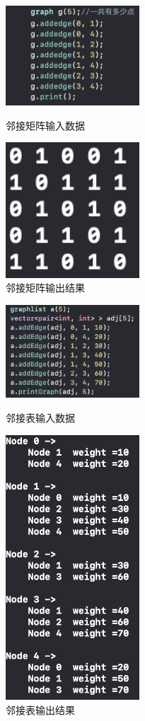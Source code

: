 \documentclass{article}
\begin{document}
\begin{figure}[htb]
    \centering
\begin{minipage}[t]{0.48\textwidth}
    \centering
    \includegraphics[width=5cm]{data.png}
    \caption{邻接矩阵输入数据}
\end{minipage}
\begin{minipage}[t]{0.48\textwidth}
    \centering
    \includegraphics[width=5cm]{conclu.png}
    \caption{邻接矩阵输出结果}
\end{minipage}
\end{figure}

\begin{figure}[htb]
    \centering
\begin{minipage}[t]{0.48\textwidth}
    \centering
    \includegraphics[width=5cm]{data 2.png}
    \caption{邻接表输入数据}
\end{minipage}
\begin{minipage}[t]{0.48\textwidth}
    \centering
    \includegraphics[width=5cm]{conclu 2.png}
    \caption{邻接表输出结果}
\end{minipage}
\end{figure}
\end{document}
